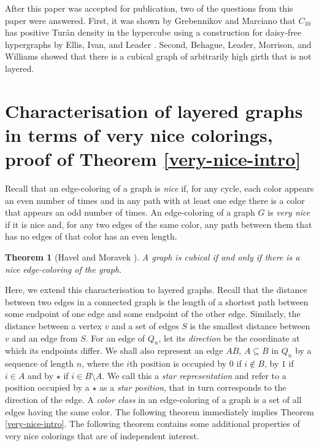 \documentclass[11pt, a4paper]{article}
\newtheorem{theorem}{Theorem}
\begin{document}
 After this paper was accepted for publication, two of the questions from this paper were answered. First, it was shown by Grebennikov and Marciano \cite{GM} that $C_{10}$ has positive Tur\'an density in the hypercube using a construction for daisy-free hypergraphs by  Ellis, Ivan, and Leader \cite{EIL}.  Second,   Behague, Leader,  Morrison,  and Williams \cite{BLMW}   showed that there is a cubical graph of arbitrarily high girth that is not layered. 


\vskip 1cm



\section{Characterisation of layered graphs in terms of very nice colorings, proof of Theorem \ref{very-nice-intro}}\label{colorings}

	Recall that  an edge-coloring of a graph is {\it nice} if, for any cycle, each color appears an even number of times and in any path with at least one edge there is a color that appears an  odd number of times. An edge-coloring of a graph $G$ is {\it very nice} if  it is nice and, for any two edges of the same color, any path between them that has no edges of that color has an even length. 
	
	\begin{theorem}[Havel and Moravek \cite{HM}]
	A graph is cubical if and only if there is a nice edge-coloring of the graph. 
	\end{theorem}
		
		
	Here, we extend this characterisation to layered graphs. Recall that the distance between two edges in a connected graph is the length of a shortest path between some endpoint of one edge and some endpoint of the other edge. Similarly, the distance between a vertex $v$  and a set of edges $S$ is the smallest distance between $v$ and an edge from $S$. For an edge of $Q_n$, let its {\it direction} be the coordinate at which its endpoints differ.  We shall also represent an edge $AB$, $A\subseteq B$ in $Q_n$ by a sequence of length $n$, 
where the $i$th position is occupied by $0$ if $i\notin B$,  by $1$ if $i\in A$ and by $\star$ if $i\in B\setminus A$.  We call this a \textit{star representation} and refer to a position occupied by a $\star$ as a {\it star position}, that in turn corresponds to the direction of the edge.  A {\it color class} in an edge-coloring of a graph is a set of all edges having the same color. The following theorem immediately implies Theorem \ref{very-nice-intro}. The following theorem contains some additional properties of very nice colorings that are of independent interest.
	
\end{document}
